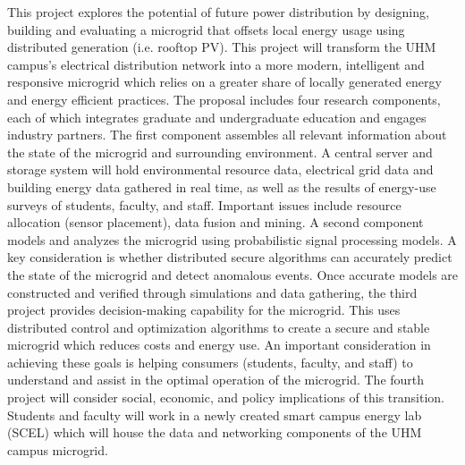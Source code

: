 \documentclass{proposalnsf}
\begin{document}
  This project explores the potential of future power distribution by designing, building and evaluating a microgrid that offsets local energy usage using distributed generation (i.e. rooftop PV). This project will transform the UHM campus's electrical distribution network into a more modern, intelligent and responsive microgrid which relies on a greater share of locally generated energy and energy efficient practices. The proposal includes four research components, each of which integrates graduate and undergraduate education and engages industry partners. 
The first component assembles all relevant information about the state of the microgrid and surrounding environment. A central server and storage system will hold environmental resource data, electrical grid data and building energy data gathered in real time, as well as the results of energy-use surveys of students, faculty, and staff.  Important issues include resource allocation (sensor placement), data fusion and mining. A second component models and analyzes the microgrid using probabilistic signal processing models. A key consideration is whether distributed secure algorithms can accurately predict the state of the microgrid and detect anomalous events. Once accurate models are constructed and verified through simulations and data gathering, the third project provides decision-making capability for the microgrid. This uses distributed control and optimization algorithms to create a secure and stable microgrid which reduces costs and energy use. An important consideration in achieving these goals is helping consumers (students, faculty, and staff) to understand and assist in the optimal operation of the microgrid. The fourth project will consider social, economic, and policy implications of this transition. Students and faculty will work in a newly created smart campus energy lab (SCEL) which will house the data and networking components of the UHM campus microgrid.
 
\end{document}
